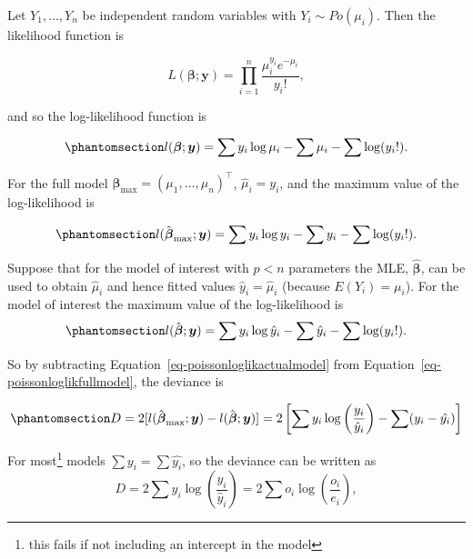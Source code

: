 \documentclass[
  a4paper,
  DIV=11,
  numbers=noendperiod]{scrreprt}
\newenvironment{fbxSimple}[3]{\begin{tcolorbox}[enhanced, breakable,%
attach boxed title to top*={xshift=1.4pt},
boxed title style={boxrule=0.0mm, fuzzy shadow={1pt}{-1pt}{0mm}{0.1mm}{gray}, arc=.3em, rounded corners=east, sharp corners=west}, colframe=#1-color2, colbacktitle=#1-color1, colback = white, coltitle=black,  titlerule=0mm, toprule=0pt, bottomrule=.7pt, leftrule=.3em, rightrule=.7pt, outer arc=.3em,  	left=.5em, right=.5em, bottomtitle=1mm, toptitle=1mm,title=\textbf{#2}\hspace{0.5em}{#3}]}
{\end{tcolorbox}}
\begin{document}
\label{deviance-for-a-poisson-model}
\begin{fbxSimple}{Example}{Example 11: }{Deviance for a Poisson model}
\label{deviance-for-a-poisson-model}
Let \(Y_1, \dots, Y_n\) be independent random variables with
\(Y_i \sim Po(\mu_i)\). Then the likelihood function is

\[
L(\boldsymbol{\beta}; \boldsymbol{y}) = \prod_{i=1}^n \frac{\mu_i^{y_i}e^{-\mu_i}}{y_i!},
\]

and so the log-likelihood function is

\begin{equation}\phantomsection\label{eq-poissonloglik}{
l(\boldsymbol{\beta}; \boldsymbol{y}) = \sum y_i \log \mu_i - \sum \mu_i -\sum \log (y_i!).
}\end{equation}

For the full model
\(\boldsymbol{\beta}_{\max}= (\mu_1,\dots, \mu_n)^\intercal\),
\(\hat{\mu}_i=y_i\), and the maximum value of the log-likelihood is

\begin{equation}\phantomsection\label{eq-poissonloglikfullmodel}{
l(\hat{\boldsymbol{\beta}}_{\max}; \boldsymbol{y}) = \sum y_i \log y_i - \sum y_i -\sum \log (y_i!).
}\end{equation}

Suppose that for the model of interest with \(p<n\) parameters the MLE,
\(\hat{\boldsymbol{\beta}}\), can be used to obtain \(\hat{\mu}_i\) and
hence fitted values \(\hat{y}_i=\hat{\mu}_i\) (because
\(E(Y_i)=\mu_i\)). For the model of interest the maximum value of the
log-likelihood is
\begin{equation}\phantomsection\label{eq-poissonloglikactualmodel}{
l(\hat{\boldsymbol{\beta}}; \boldsymbol{y}) = \sum y_i \log \hat{y}_i - \sum \hat{y}_i -\sum \log (y_i!).
}\end{equation}

So by subtracting Equation~\ref{eq-poissonloglikactualmodel} from
Equation~\ref{eq-poissonloglikfullmodel}, the deviance is

\begin{equation}\phantomsection\label{eq-devpoisson}{
D= 2 [l(\hat{\boldsymbol{\beta}}_{\max}; \boldsymbol{y}) -l(\hat{\boldsymbol{\beta}}; \boldsymbol{y}) ]= 2 \left[\sum y_i \log\left(\frac{y_i} {\hat{y}_i}\right)-\sum (y_i-\hat{y_i}) \right]
}\end{equation}

For most\footnote{this fails if not including an intercept in the model}
models \(\sum y_i=\sum \hat{y_i}\), so the deviance can be written as \[
D=2 \sum y_i \log\left(\frac{y_i} {\hat{y}_i}\right)= 2 \sum o_i \log\left(\frac{o_i} {e_i}\right),
\]


\end{fbxSimple}
\end{document}
